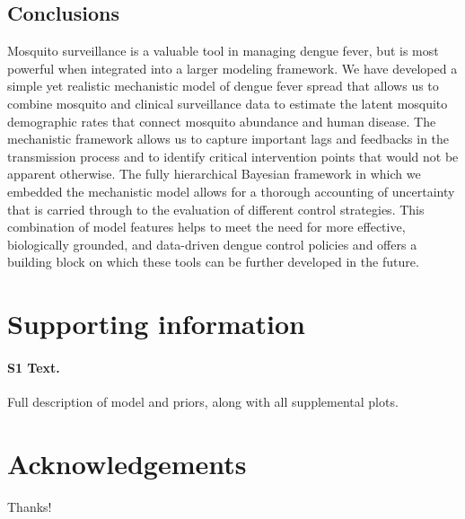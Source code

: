 \documentclass[10pt,letterpaper]{article}
\begin{document}
\subsection*{Conclusions}

Mosquito surveillance is a valuable tool in managing dengue fever, but is most powerful when integrated into a larger modeling framework.
We have developed a simple yet realistic mechanistic model of dengue fever spread that allows us to combine mosquito and clinical surveillance data to estimate the latent mosquito demographic rates that connect mosquito abundance and human disease.
The mechanistic framework allows us to capture important lags and feedbacks in the transmission process and to identify critical intervention points that would not be apparent otherwise.
The fully hierarchical Bayesian framework in which we embedded the mechanistic model allows for a thorough accounting of uncertainty that is carried through to the evaluation of different control strategies.
This combination of model features helps to meet the need for more effective, biologically grounded, and data-driven dengue control policies and offers a building block on which these tools can be further developed in the future.

\section*{Supporting information}

\paragraph*{S1 Text.}
\label{S1}
{Full description of model and priors, along with all supplemental plots.}

\section*{Acknowledgements}

Thanks!

\nolinenumbers

%
%
% 



\end{document}
